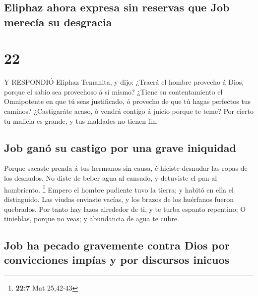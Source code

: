 \hypertarget{eliphaz-ahora-expresa-sin-reservas-que-job-merecuxeda-su-desgracia}{%
\subsection{Eliphaz ahora expresa sin reservas que Job merecía su
desgracia}\label{eliphaz-ahora-expresa-sin-reservas-que-job-merecuxeda-su-desgracia}}

\hypertarget{section-21}{%
\section{22}\label{section-21}}

 Y RESPONDIÓ Eliphaz Temanita, y dijo:  ¿Traerá
el hombre provecho á Dios, porque el sabio sea provechoso á sí mismo?
 ¿Tiene su contentamiento el Omnipotente en que tú seas
justificado, ó provecho de que tú hagas perfectos tus caminos?
 ¿Castigaráte acaso, ó vendrá contigo á juicio porque te
teme?  Por cierto tu malicia es grande, y tus maldades no
tienen fin.

\hypertarget{job-ganuxf3-su-castigo-por-una-grave-iniquidad}{%
\subsection{Job ganó su castigo por una grave
iniquidad}\label{job-ganuxf3-su-castigo-por-una-grave-iniquidad}}

 Porque sacaste prenda á tus hermanos sin causa, é hiciste
desnudar las ropas de los desnudos.  No diste de beber agua
al cansado, y detuviste el pan al hambriento. \footnote{\textbf{22:7}
  Mat 25,42-43}  Empero el hombre pudiente tuvo la tierra; y
habitó en ella el distinguido.  Las viudas enviaste vacías,
y los brazos de los huérfanos fueron quebrados.  Por tanto
hay lazos alrededor de ti, y te turba espanto repentino;  O
tinieblas, porque no veas; y abundancia de agua te cubre.

\hypertarget{job-ha-pecado-gravemente-contra-dios-por-convicciones-impuxedas-y-por-discursos-inicuos}{%
\subsection{Job ha pecado gravemente contra Dios por convicciones impías
y por discursos
inicuos}\label{job-ha-pecado-gravemente-contra-dios-por-convicciones-impuxedas-y-por-discursos-inicuos}}

